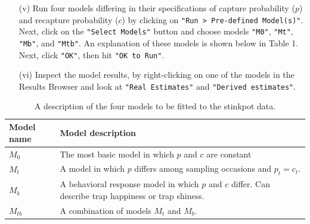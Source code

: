 \documentclass[12pt]{article}
\begin{document}
\begin{enumerate}
  \item[(v)] Run four models differing in their specifications of
    capture probability ($p$) and recapture probability ($c$) by
    clicking on  \verb+"Run > Pre-defined Model(s)"+. Next, click on the
    \verb+"Select Models"+ button and choose models \verb+"M0"+,
    \verb+"Mt"+, \verb+"Mb"+, and \verb+"Mtb"+. An explanation of these
    models is shown below in Table 1. Next, click \verb+"OK"+, then
    hit \verb+"OK to Run"+. 
  \item[(vi)] Inspect the model results, by right-clicking on one of
    the models in the Results Browser and look at
    \verb+"Real Estimates"+ and \verb+"Derived estimates"+. 
\end{enumerate}

\begin{table}[h!]
  \centering
  \caption{A description of the four models to be fitted to the
    stinkpot data.}
  \footnotesize
  \begin{tabular}[h!]{ll}
    \hline
    Model name & Model description \\
    \hline
    $M_0$ & The most basic model in which $p$ and $c$ are constant \\
    $M_t$ & A model in which $p$ differs among sampling occasions and
            $p_t=c_t$. \\
    $M_b$ & A behavioral response model in which $p$ and $c$
            differ. Can describe trap happiness or trap shiness. \\
    $M_{tb}$ & A combination of models $M_t$ and $M_b$. \\
    \hline
  \end{tabular}
  \label{tab:Otis}
\end{table}
\end{document}
